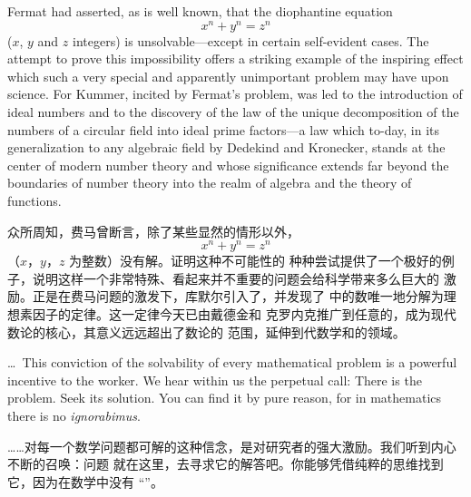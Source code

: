 \documentclass{mojing-translation}
\begin{document}
\begin{pairs}
\begin{original}
Fermat had asserted, as is well known, that the diophantine equation
\[ x^n+y^n=z^n \]
($x$, $y$ and $z$ integers) is unsolvable---except in certain self-evident cases. The attempt to
prove this impossibility offers a striking example of the inspiring effect which such a very
special and apparently unimportant problem may have upon science. For Kummer, incited by
Fermat's problem, was led to the introduction of ideal numbers and to the discovery of the law
of the unique decomposition of the numbers of a circular field into ideal prime factors---a law
which to-day, in its generalization to any algebraic field by Dedekind and Kronecker, stands at
the center of modern number theory and whose significance extends far beyond the boundaries of
number theory into the realm of algebra and the theory of functions.
\end{original}
\begin{translated}
众所周知，费马曾断言，除了某些显然的情形以外，
\[ x^n+y^n=z^n \]
（$x$，$y$，$z$ 为整数）没有解。证明这种不可能性的
种种尝试提供了一个极好的例子，说明这样一个非常特殊、看起来并不重要的问题会给科学带来多么巨大的
激励。正是在费马问题的激发下，库默尔引入了，并发现了
中的数唯一地分解为理想素因子的定律。这一定律今天已由戴德金和
克罗内克推广到任意的，成为现代数论的核心，其意义远远超出了数论的
范围，延伸到代数学和的领域。
\end{translated}

\omission

\begin{original}
\dots\ This conviction of the solvability of every mathematical problem is a powerful incentive
to the worker. We hear within us the perpetual call: There is the problem. Seek its solution.
You can find it by pure reason, for in mathematics there is no \textit{ignorabimus}.
\end{original}
\begin{translated}
……对每一个数学问题都可解的这种信念，是对研究者的强大激励。我们听到内心不断的召唤：问题
就在这里，去寻求它的解答吧。你能够凭借纯粹的思维找到它，因为在数学中没有
“”。
\end{translated}


\end{pairs}
\end{document}
